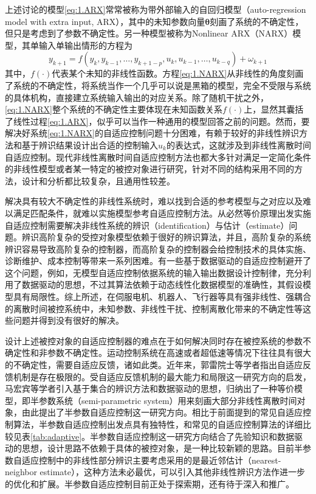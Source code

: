 上述讨论的模型\eqref{eq:1.ARX}常常被称为带外部输入的自回归模型（auto-regression model with extra input, ARX），其中的未知参数向量$\bm{\theta}$刻画了系统的不确定性，但只是考虑到了参数不确定性。另一种模型被称为Nonlinear ARX（NARX）模型，其单输入单输出情形的方程为
\begin{equation}%
\label{eq:1.NARX}
y_{k+1} = f(y_{k},y_{k-1},\ldots,y_{k+1-p},u_{k},u_{k-1},\ldots,u_{k-q})+\omega_{k+1}
\end{equation}
其中，$f(\cdot)$代表某个未知的非线性函数。方程\eqref{eq:1.NARX}从非线性的角度刻画了系统的不确定性，将系统当作一个几乎可以说是黑箱的模型，完全不受限与系统的具体机构，直接建立系统输入输出的对应关系。除了随机干扰之外，\eqref{eq:1.NARX}整个系统的不确定性主要体现在未知函数关系$f(\cdot)$上，显然其囊括了线性过程\eqref{eq:1.ARX}，似乎可以当作一种通用的模型回答之前的问题。然而，要解决好系统\eqref{eq:1.NARX}的自适应控制问题十分困难，有赖于较好的非线性辨识方法和基于辨识结果设计出合适的控制输入$u_{k}$的表达式，这就涉及到非线性离散时间自适应控制。现代非线性离散时间自适应控制方法也都大多针对满足一定简化条件的非线性模型或者某一特定的被控对象进行研究，针对不同的结构采用不同的方法，设计和分析都比较复杂，且通用性较差。

解决具有较大不确定性的非线性系统时，难以找到合适的参考模型与之对应以及难以满足匹配条件，就难以实施模型参考自适应控制方法。从必然等价原理出发实施自适应控制需要解决非线性系统的辨识（identification）与估计（estimate）问题。辨识高阶复杂的受控对象模型依赖于很好的辨识算法，并且，高阶复杂的系统辨识容易导致高阶复杂的控制器，而高阶复杂的控制器会给控制技术的具体实施、诊断维护、成本控制等带来一系列困难。有一些基于数据驱动的自适应控制避开了这个问题，例如，无模型自适应控制依据系统的输入输出数据设计控制律，充分利用了数据驱动的思想，不过其算法依赖于动态线性化数据模型的准确性，其假设模型具有局限性。综上所述，在伺服电机、机器人、飞行器等具有强非线性、强耦合的离散时间被控系统中，未知参数、非线性干扰、控制离散化带来的不确定性等这些问题并得到没有很好的解决。

设计上述被控对象的自适应控制器的难点在于如何解决同时存在被控系统的参数不确定性和非参数不确定性。运动控制系统在高速或者超低速等情况下往往具有很大的不确定性，需要自适应反馈，诸如此类。近年来，郭雷院士等学者指出自适应反馈机制是存在极限的。受自适应反馈机制的最大能力和局限这一研究方向的启发，马宏宾等学者引入基于集合的辨识方法和数据驱动的思想，归纳出了一种等价模型，即半参数系统（semi-parametric system）用来刻画大部分非线性离散时间对象，由此提出了半参数自适应控制这一研究方向。相比于前面提到的常见自适应控制算法，半参数自适应控制出发点具有独特性，和常见的自适应控制算法的详细比较见表\eqref{tab:adaptive}。半参数自适应控制这一研究方向结合了先验知识和数据驱动的思想，设计思路不依赖于具体的被控对象，是一种比较新颖的思路。目前半参数自适应控制中的非线性部分辨识主要考虑采用的是最近邻估计（nearest-neighbor estimate），这种方法未必最优，可以引入其他非线性辨识方法作进一步的优化和扩展。半参数自适应控制目前正处于探索期，还有待于深入和推广。

